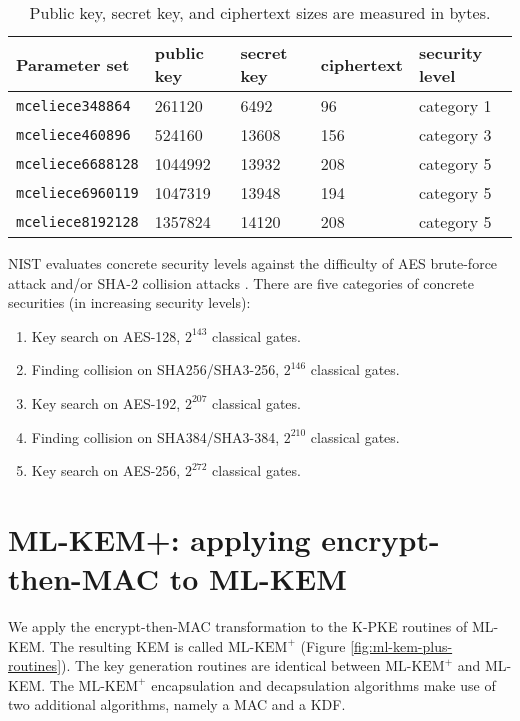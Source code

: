 \documentclass[runningheads]{llncs}
\def\mlkemplus{\text{ML-KEM}^+}
\begin{document}
\begin{table}[h]
    \centering
    \begin{tabular}{|p{8em}|p{5em}|p{5em}|p{5em}|p{8em}|}
        \hline
        Parameter set & public key & secret key & ciphertext & security level \cite{classic-mceliece-security-guide} \\
        \hline
        \texttt{mceliece348864} & 261120 & 6492 & 96 & category 1 \\
        \hline
        \texttt{mceliece460896} & 524160 & 13608 & 156 & category 3 \\
        \hline
        \texttt{mceliece6688128} & 1044992 & 13932 & 208 & category 5 \\
        \hline
        \texttt{mceliece6960119} & 1047319 & 13948 & 194 & category 5 \\
        \hline
        \texttt{mceliece8192128} & 1357824 & 14120 & 208 & category 5 \\
        \hline
    \end{tabular}
    \caption{Public key, secret key, and ciphertext sizes are measured in bytes.}\label{tab:classic-mceliece-parameter-sets}
\end{table}

NIST evaluates concrete security levels against the difficulty of AES brute-force attack and/or SHA-2 collision attacks \cite{NIST_PQC_Evaluation}. There are five categories of concrete securities (in increasing security levels): \begin{enumerate}
    \item Key search on AES-128, $2^{143}$ classical gates.
    \item Finding collision on SHA256/SHA3-256, $2^{146}$ classical gates.
    \item Key search on AES-192, $2^{207}$ classical gates.
    \item Finding collision on SHA384/SHA3-384, $2^{210}$ classical gates.
    \item Key search on AES-256, $2^{272}$ classical gates.
\end{enumerate}

\section{ML-KEM+: applying encrypt-then-MAC to ML-KEM}\label{sec:applying-encrypt-then-mac-to-ml-kem}
We apply the encrypt-then-MAC transformation to the K-PKE routines of ML-KEM. The resulting KEM is called $\mlkemplus$ (Figure \ref{fig:ml-kem-plus-routines}). The key generation routines are identical between $\mlkemplus$ and ML-KEM. The $\mlkemplus$  encapsulation and decapsulation algorithms make use of two additional algorithms, namely a {\sf MAC} and a {\sf KDF}.
\end{document}
